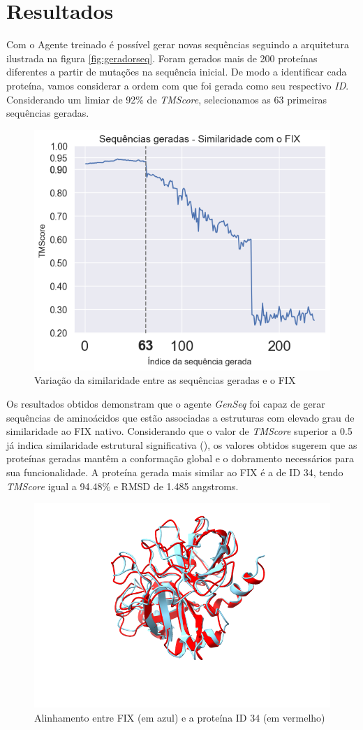 \chapter{Resultados}

Com o Agente treinado é possível gerar novas sequências seguindo a arquitetura 
ilustrada na figura \ref{fig:geradorseq}. 
Foram gerados mais de 200 proteínas diferentes a partir de mutações na sequência inicial. 
De modo a identificar cada proteína, 
vamos considerar a ordem com que foi gerada como seu respectivo \textit{ID}.
Considerando um limiar de 92\% de \textit{TMScore}, selecionamos as 
63 primeiras sequências geradas.

\begin{figure}[H]
    \centering
    \includegraphics[width=.6\linewidth]{figuras/plot_tmscore_decreasing.png}    
    \caption{Variação da similaridade entre as sequências geradas e o FIX}
    \label{fig:tmscore_decreasing}
  \end{figure}

Os resultados obtidos demonstram que o agente \textit{GenSeq} foi capaz de gerar sequências de aminoácidos que
estão associadas a estruturas com elevado grau de similaridade ao FIX nativo.
Considerando que o valor de \textit{TMScore} superior a 0.5 já indica similaridade estrutural significativa (\cite{05TMScore}),
os valores obtidos sugerem que as proteínas geradas mantêm a conformação global e o dobramento necessários para sua funcionalidade.
A proteína gerada mais similar ao FIX é a de ID 34,
tendo \textit{TMScore} igual a 94.48\% e RMSD de 1.485 angstroms. 

\begin{figure}[H]
    \centering
    \includegraphics[width=.6\linewidth]{figuras/FIXvsID34.png}    
    \caption{Alinhamento entre FIX (em azul) e a proteína ID 34 (em vermelho)}
    \label{fig:FIX_vs_ID34}
\end{figure}


